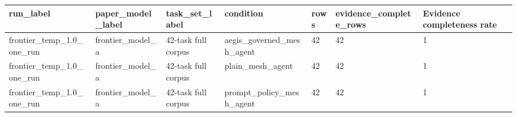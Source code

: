 \begin{tabular}{lllllll}
 \hline
run\_label & paper\_model\_label & task\_set\_label & condition & rows & evidence\_complete\_rows & Evidence completeness rate \\
 \hline
frontier\_temp\_1.0\_one\_run & frontier\_model\_a & 42-task full corpus & aegis\_governed\_mesh\_agent & 42 & 42 & 1 \\
frontier\_temp\_1.0\_one\_run & frontier\_model\_a & 42-task full corpus & plain\_mesh\_agent & 42 & 42 & 1 \\
frontier\_temp\_1.0\_one\_run & frontier\_model\_a & 42-task full corpus & prompt\_policy\_mesh\_agent & 42 & 42 & 1 \\
 \hline
\end{tabular}
